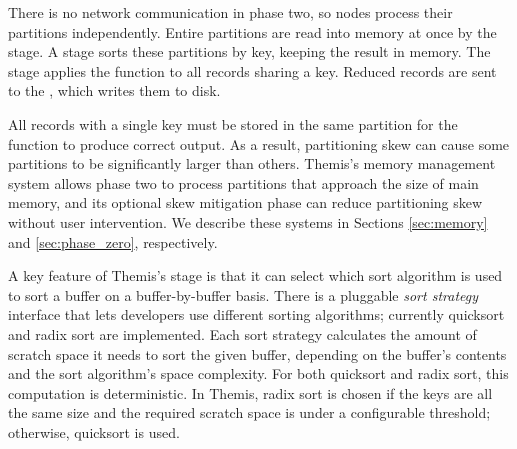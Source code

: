 There is no network communication in phase two, so nodes process their
partitions independently.  Entire partitions are read into memory at once by
the \Readerbf stage. A \Sorterbf stage sorts these partitions by key, keeping
the result in memory.  The \Reducerbf stage applies the \reduce function to all
records sharing a key.  Reduced records are sent to the \Writerbf, which writes
them to disk.

All records with a single key must be stored in the same partition for the
\reduce function to produce correct output. As a result, partitioning skew can
cause some partitions to be significantly larger than others. Themis's memory
management system allows phase two to process partitions that approach the size
of main memory, and its optional skew mitigation phase can reduce partitioning
skew without user intervention. We describe these systems in Sections
\ref{sec:memory} and \ref{sec:phase_zero}, respectively.

A key feature of Themis's \sorter stage is that it can select which sort
algorithm is used to sort a buffer on a buffer-by-buffer basis.  There is a
pluggable \textit{sort strategy} interface that lets developers use different
sorting algorithms; currently quicksort and radix sort are implemented.  Each
sort strategy calculates the amount of scratch space it needs to sort the given
buffer, depending on the buffer's contents and the sort algorithm's space
complexity.  For both quicksort and radix sort, this computation is
deterministic.  In Themis, radix sort is chosen if the keys are all the same
size and the required scratch space is under a configurable threshold;
otherwise, quicksort is used.

